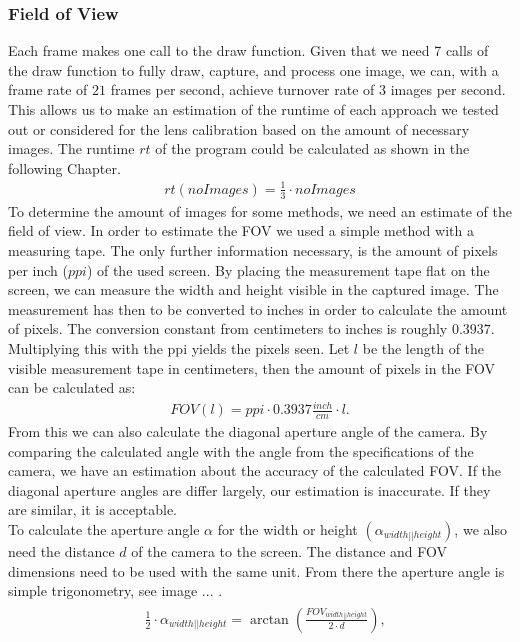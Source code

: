 \documentclass[journal,final,a4paper,twoside]{PS}
\begin{document}
\subsubsection{Field of View}
\label{sec:FOV}
Each frame makes one call to the draw function. Given that we need 7 calls of the draw function to fully draw, capture, and process one image, we can, with a frame rate of $21$ frames per second, achieve turnover rate of $3$ images per second. This allows us to make an estimation of the runtime of each approach we tested out or considered for the lens calibration based on the amount of necessary images. The runtime $rt$ of the program could be calculated as shown in the following Chapter. 
\begin{align}
rt(noImages) = \frac{1}{3} \cdot noImages 
\end{align}
To determine the amount of images for some methods, we need an estimate of the field of view. In order to estimate the FOV we used a simple method with a measuring tape. The only further information necessary, is the amount of pixels per inch ($ppi$) of the used screen. By placing the measurement tape flat on the screen, we can measure the width and height visible in the captured image. The measurement has then to be converted to inches in order to calculate the amount of pixels. The conversion constant from centimeters to inches is roughly $0.3937$. Multiplying this with the ppi yields the pixels seen. Let $l$ be the length of the visible measurement tape in centimeters, then the amount of pixels in the FOV can be calculated as:
\begin{align}
FOV(l) = ppi \cdot 0.3937 \frac{inch}{cm} \cdot l .
\end{align}
From this we can also calculate the diagonal aperture angle of the camera. By comparing the calculated angle with the angle from the specifications of the camera, we have an estimation about the accuracy of the calculated FOV. If the diagonal aperture angles are differ largely, our estimation is inaccurate. If they are similar, it is acceptable.\\
To calculate the aperture angle $\alpha$ for the width or height $\left( \alpha_{width||height}\right)$, we also need the distance $d$ of the camera to the screen. The distance and FOV dimensions need to be used with the same unit. From there the aperture angle is simple trigonometry, see image ... .
\begin{align}\begin{split}
&\frac{1}{2}\cdot\alpha_{width||height}  =  \arctan \left(\frac{FOV_{width||height }}{2\cdot d} \right),
\end{split}
\end{align}
\end{document}
